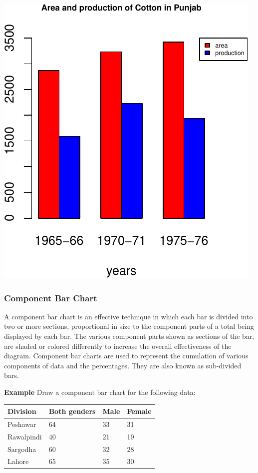 \documentclass[]{article}
\begin{document}
\includegraphics{chapt2_files/figure-latex/Mutliple bar chart-1.pdf}

\hypertarget{component-bar-chart}{%
\subsubsection{Component Bar Chart}\label{component-bar-chart}}

A component bar chart is an effective technique in which each bar is
divided into two or more sections, proportional in size to the component
parts of a total being displayed by each bar. The various component
parts shown as sections of the bar, are shaded or colored differently to
increase the overall effectiveness of the diagram. Component bar charts
are used to represent the cumulation of various components of data and
the percentages. They are also known as sub-divided bars.

\textbf{Example} Draw a component bar chart for the following data:

\begin{longtable}[]{@{}llll@{}}
\toprule
Division & Both genders & Male & Female\tabularnewline
\midrule
\endhead
Peshawar & 64 & 33 & 31\tabularnewline
Rawalpindi & 40 & 21 & 19\tabularnewline
Sargodha & 60 & 32 & 28\tabularnewline
Lahore & 65 & 35 & 30\tabularnewline
\bottomrule
\end{longtable}
\end{document}
